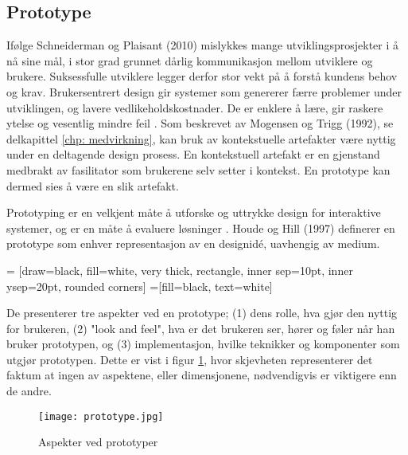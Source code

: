 \subsection{Prototype}
Ifølge Schneiderman og Plaisant (2010) mislykkes mange utviklingsprosjekter i å nå sine mål, i stor grad grunnet dårlig kommunikasjon mellom utviklere og brukere. Suksessfulle utviklere legger derfor stor vekt på å forstå kundens behov og krav. 
Brukersentrert design gir systemer som genererer færre problemer under utviklingen, og lavere vedlikeholdskostnader. De er enklere å lære, gir raskere ytelse og vesentlig mindre feil \cite{mmi}.
Som beskrevet av Mogensen og Trigg (1992), se delkapittel \ref{chp: medvirkning}, kan bruk av kontekstuelle artefakter være nyttig under en deltagende design prosess. En kontekstuell artefakt er en gjenstand medbrakt av fasilitator som brukerene selv setter i kontekst. En prototype kan dermed sies å være en slik artefakt. 

\noindent
Prototyping er en velkjent måte å utforske og uttrykke design for interaktive systemer, og er en måte å evaluere løsninger \cite{Houde97}. Houde og Hill (1997) definerer en prototype som enhver representasjon av en designidé, uavhengig av medium. 

 = [draw=black, fill=white, very thick,
    rectangle, inner sep=10pt, inner ysep=20pt, rounded corners]
 =[fill=black, text=white]
%

\noindent
De presenterer tre aspekter ved en prototype; (1) dens rolle, hva gjør den nyttig for brukeren, (2) "look and feel", hva er det brukeren ser, hører og føler når han bruker prototypen, og (3) implementasjon, hvilke teknikker og komponenter som utgjør prototypen. Dette er vist i figur \ref{fig: prototype}, hvor skjevheten representerer det faktum at ingen av aspektene, eller dimensjonene, nødvendigvis er viktigere enn de andre.

\begin{figure}[H]
\centering
\texttt{[image: prototype.jpg]}
\caption{Aspekter ved prototyper}
\label{fig: prototype}
\end{figure}

